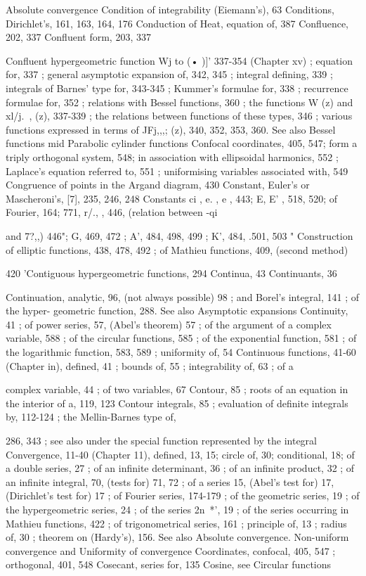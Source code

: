 Absolute convergence
Condition of integrability (Eiemann's), 63
Conditions, Dirichlet's, 161, 163, 164, 176
Conduction of Heat, equation of, 387
Confluence, 202, 337
Confluent form, 203, 337

Confluent hypergeometric function  Wj  to (• )]' 337-354 (Chapter xv) ; equation for, 337 ; general
asymptotic expansion of, 342, 345 ; integral defining, 339 ; integrals of Barnes' type for,
343-345 ; Kummer's formulae for, 338 ; recurrence formulae for, 352 ; relations with Bessel
functions, 360 ; the functions W    (z) and xl/j.\ ,  (z), 337-339 ; the relations between functions
of these types, 346 ; various functions expressed in terms of JFj,,,; (z), 340, 352, 353, 360. See
also Bessel functions mid Parabolic cylinder functions
Confocal coordinates, 405, 547; form a triply orthogonal system, 548; in association with
ellipsoidal harmonics, 552 ; Laplace's equation referred to, 551 ; uniformising variables
associated with, 549
Congruence of points in the Argand diagram, 430
Constant, Euler's or Mascheroni's, [7], 235, 246, 248
Constants ci , e. , e , 443; E, E' , 518, 520; of Fourier, 164; 771, r/., , 446, (relation between -qi

and 7?,,) 446"; G, 469, 472 ; A', 484, 498, 499 ; K', 484, .501, 503 "
Construction of elliptic functions, 438, 478, 492 ; of Mathieu functions, 409, (second method)

420
'Contiguous hypergeometric functions, 294
Continua, 43
Continuants, 36

Continuation, analytic, 96, (not always possible) 98 ; and Borel's integral, 141 ; of the hyper-
geometric function, 288. See also Asymptotic expansions
Continuity, 41 ; of power series, 57, (Abel's theorem) 57 ; of the argument of a complex variable,
588 ; of the circular functions, 585 ; of the exponential function, 581 ; of the logarithmic
function, 583, 589 ; uniformity of, 54
Continuous functions, 41-60 (Chapter in), defined, 41 ; bounds of, 55 ; integrability of, 63 ; of a

complex variable, 44 ; of two variables, 67
Contour, 85 ; roots of an equation in the interior of a, 119, 123
Contour integrals, 85 ; evaluation of definite integrals by, 112-124 ; the Mellin-Barnes type of,

286, 343 ; see also under the special function represented by the integral
Convergence, 11-40 (Chapter 11), defined, 13, 15; circle of, 30; conditional, 18; of a double
series, 27 ; of an infinite determinant, 36 ; of an infinite product, 32 ; of an infinite integral,
70, (tests for) 71, 72 ; of a series 15, (Abel's test for) 17, (Dirichlet's test for) 17 ; of Fourier
series, 174-179 ; of the geometric series, 19 ; of the hypergeometric series, 24 ; of the series
2n~*', 19 ; of the series occurring in Mathieu functions, 422 ; of trigonometrical series, 161 ;
principle of, 13 ; radius of, 30 ; theorem on (Hardy's), 156. See also Absolute convergence.
Non-uniform convergence and Uniformity of convergence
Coordinates, confocal, 405, 547 ; orthogonal, 401, 548
Cosecant, series for, 135
Cosine, see Circular functions

